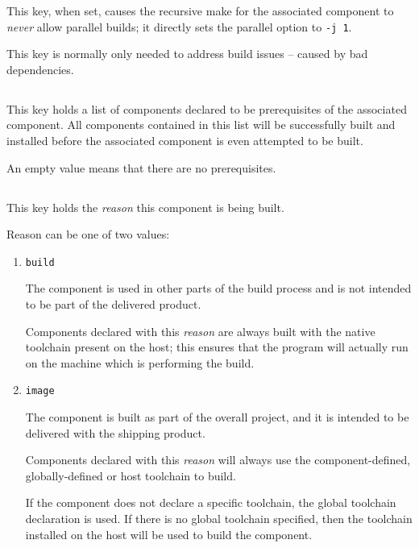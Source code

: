 This key, when set, causes the recursive make for the associated
component to \emph{never} allow parallel builds; it directly sets the
\gnumake parallel option to \texttt{-j 1}.

This key is normally only needed to address build issues -- caused by
bad dependencies.


\subsection{}\label{variables:prerequisite}

This key holds a list of components declared to be prerequisites of
the associated component.  All components contained in this list will
be successfully built and installed before the associated component is
even attempted to be built.

An empty value means that there are no prerequisites.


\subsection{}\label{variables:reason}

This key holds the \emph{reason} this component is being built.

Reason can be one of two values:

  \begin{enumerate}
  \item \texttt{build}

    The component is used in other parts of the build process and is
    not intended to be part of the delivered product.

    Components declared with this \emph{reason} are always built with
    the native toolchain present on the host; this ensures that the
    program will actually run on the machine which is performing the
    build.

  \item \texttt{image}

    The component is built as part of the overall project, and it is
    intended to be delivered with the shipping product.

    Components declared with this \emph{reason} will always use the
    component-defined, globally-defined or host toolchain to build.

    If the component does not declare a specific toolchain, the global
    toolchain declaration is used.  If there is no global toolchain
    specified, then the toolchain installed on the host will be used
    to build the component.

  \end{enumerate}

